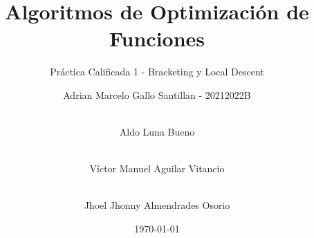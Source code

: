 \title{Algoritmos de Optimización de Funciones}
\subtitle{Práctica Calificada 1 - Bracketing y Local Descent}
\author[Gallo, Luna, Aguilar, Almendrades]{
    Adrian Marcelo Gallo Santillan - 20212022B \and \\
    Aldo Luna Bueno \and \\
    Víctor Manuel Aguilar Vitancio \and \\
    Jhoel Jhonny Almendrades Osorio
}
\date{\today}
